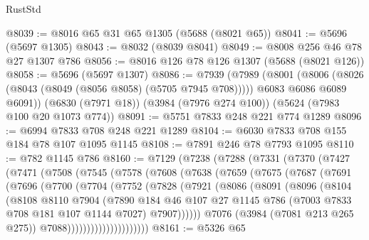 \begin{lexlean}{RustStd}
\begin{coremodule}
@8039 := @8016 @65 @31 @65 @1305 (@5688 (@8021 @65))
@8041 := @5696 (@5697 @1305)
@8043 := @8032 (@8039 @8041)
@8049 := @8008 @256 @46 @78 @27 @1307 @786
@8056 := @8016 @126 @78 @126 @1307 (@5688 (@8021 @126))
@8058 := @5696 (@5697 @1307)
@8086 := @7939
    (@7989
      (@8001
        (@8006 (@8026 (@8043 (@8049 (@8056 @8058) (@5705 @7945 @708)))))
        @6083
        @6086
        @6089
        @6091))
    (@6830 (@7971 @18))
    (@3984 (@7976 @274 @100))
    (@5624 (@7983 @100 @20 @1073 @774))
@8091 := @5751 @7833 @248 @221 @774 @1289
@8096 := @6994 @7833 @708 @248 @221 @1289
@8104 := @6030 @7833 @708 @155 @184 @78 @107 @1095 @1145
@8108 := @7891 @246 @78 @7793 @1095
@8110 := @782 @1145 @786
@8160 := @7129
    (@7238
      (@7288
        (@7331
          (@7370
            (@7427
              (@7471
                (@7508
                  (@7545
                    (@7578
                      (@7608
                        (@7638
                          (@7659
                            (@7675
                              (@7687
                                (@7691
                                  (@7696
                                    (@7700
                                      (@7704
                                        (@7752
                                          (@7828
                                            (@7921
                                              (@8086
                                                (@8091
                                                  (@8096
                                                    (@8104
                                                      (@8108
                                                        @8110
                                                        @7904
                                                        (@7890
                                                          @184
                                                          @46
                                                          @107
                                                          @27
                                                          @1145
                                                          @786
                                                          (@7003 @7833 @708 @181 @107 @1144 @7027)
                                                          @7907))))))
                                              @7076
                                              (@3984 (@7081 @213 @265 @275))
                                              @7088)))))))))))))))))))))
@8161 := @5326 @65

\end{coremodule}
\end{lexlean}
